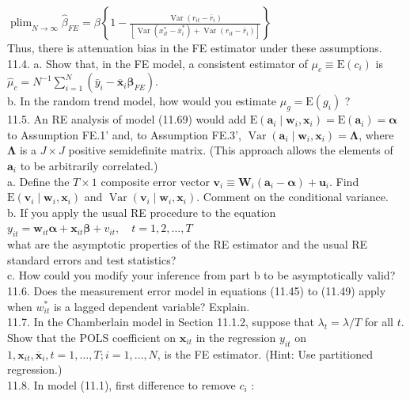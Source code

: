 \documentclass[10pt]{article}
\begin{document}
$\operatorname{plim}_{N \rightarrow \infty} \hat{\beta}_{F E}=\beta\left\{1-\frac{\operatorname{Var}\left(r_{i t}-\bar{r}_{i}\right)}{\left[\operatorname{Var}\left(x_{i t}^{*}-\bar{x}_{i}^{*}\right)+\operatorname{Var}\left(r_{i t}-\bar{r}_{i}\right)\right]}\right\}$\\
Thus, there is attenuation bias in the FE estimator under these assumptions.\\
11.4. a. Show that, in the FE model, a consistent estimator of $\mu_{c} \equiv \mathrm{E}\left(c_{i}\right)$ is $\hat{\mu}_{c}=N^{-1} \sum_{i=1}^{N}\left(\bar{y}_{i}-\overline{\mathbf{x}}_{i} \hat{\boldsymbol{\beta}}_{F E}\right)$.\\
b. In the random trend model, how would you estimate $\mu_{g}=\mathrm{E}\left(g_{i}\right)$ ?\\
11.5. An RE analysis of model (11.69) would add $\mathrm{E}\left(\mathbf{a}_{i} \mid \mathbf{w}_{i}, \mathbf{x}_{i}\right)=\mathrm{E}\left(\mathbf{a}_{i}\right)= \boldsymbol{\alpha}$ to Assumption FE.1' and, to Assumption FE.3', $\operatorname{Var}\left(\mathbf{a}_{i} \mid \mathbf{w}_{i}, \mathbf{x}_{i}\right)=\boldsymbol{\Lambda}$, where $\boldsymbol{\Lambda}$ is a $J \times J$ positive semidefinite matrix. (This approach allows the elements of $\mathbf{a}_{i}$ to be arbitrarily correlated.)\\
a. Define the $T \times 1$ composite error vector $\mathbf{v}_{i} \equiv \mathbf{W}_{i}\left(\mathbf{a}_{i}-\boldsymbol{\alpha}\right)+\mathbf{u}_{i}$. Find $\mathrm{E}\left(\mathbf{v}_{i} \mid \mathbf{w}_{i}, \mathbf{x}_{i}\right)$ and $\operatorname{Var}\left(\mathbf{v}_{i} \mid \mathbf{w}_{i}, \mathbf{x}_{i}\right)$. Comment on the conditional variance.\\
b. If you apply the usual RE procedure to the equation\\
$y_{i t}=\mathbf{w}_{i t} \boldsymbol{\alpha}+\mathbf{x}_{i t} \boldsymbol{\beta}+v_{i t}, \quad t=1,2, \ldots, T$\\
what are the asymptotic properties of the RE estimator and the usual RE standard errors and test statistics?\\
c. How could you modify your inference from part b to be asymptotically valid?\\
11.6. Does the measurement error model in equations (11.45) to (11.49) apply when $w_{i t}^{*}$ is a lagged dependent variable? Explain.\\
11.7. In the Chamberlain model in Section 11.1.2, suppose that $\lambda_{t}=\lambda / T$ for all $t$. Show that the POLS coefficient on $\mathbf{x}_{i t}$ in the regression $y_{i t}$ on $1, \mathbf{x}_{i t}, \overline{\mathbf{x}}_{i}, t= 1, \ldots, T ; i=1, \ldots, N$, is the FE estimator. (Hint: Use partitioned regression.)\\
11.8. In model (11.1), first difference to remove $c_{i}$ :
\end{document}
